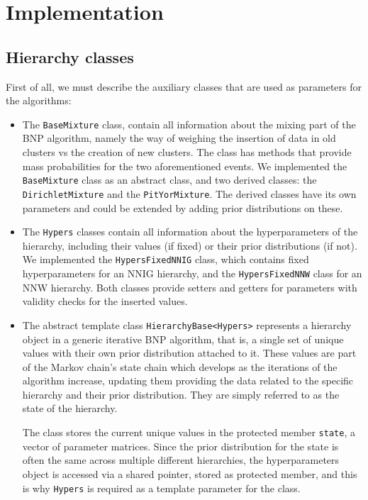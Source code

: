 \part{Implementation}

\chapter{Hierarchy classes}
First of all, we must describe the auxiliary classes that are used as parameters for the algorithms:
\begin{itemize}
	\item The \verb|BaseMixture| class, contain all information about the mixing part of the BNP algorithm, namely the way of weighing the insertion of data in old clusters vs the creation of new clusters. The class has methods that provide mass probabilities for the two aforementioned events. We implemented the \verb|BaseMixture| class as an abstract class, and two derived classes: the \verb|DirichletMixture| and the \verb|PitYorMixture|. The derived classes have its own parameters and could be extended by adding prior distributions on these.

	\item The \verb|Hypers| classes contain all information about the hyperparameters of the hierarchy, including their values (if fixed) or their prior distributions (if not). We implemented the \verb|HypersFixedNNIG| class, which contains fixed hyperparameters for an NNIG hierarchy, and the \verb|HypersFixedNNW| class for an NNW hierarchy. Both classes provide setters and getters for parameters with validity checks for the inserted values.
	
	\item The abstract template class \verb|HierarchyBase<Hypers>| represents a hierarchy object in a generic iterative BNP algorithm, that is, a single set of unique values with their own prior
distribution attached to it. These values are part of the Markov chain's
state chain which develops as the iterations of the algorithm increase, updating them providing the data related to the specific hierarchy and their prior distribution.
They are simply referred to as the state of the hierarchy. 

The class stores the current unique values in the protected member \verb|state|, a vector of parameter matrices.
Since the prior distribution for the state is often the same across multiple
different hierarchies, the hyperparameters object is accessed via a shared
pointer, stored as protected member, and this is why \verb|Hypers| is required as a template parameter for the class. 


\end{itemize}
